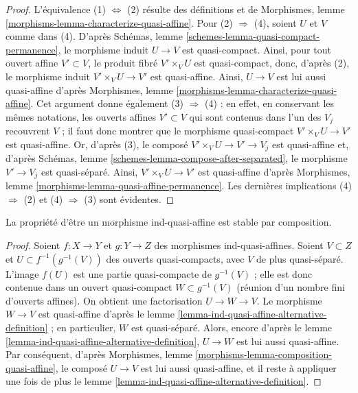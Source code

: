 \begin{proof}
L'équivalence (1) $\Leftrightarrow$ (2)
résulte des définitions et de
Morphismes, lemme \ref{morphisms-lemma-characterize-quasi-affine}.
Pour (2) $\Rightarrow$ (4), soient $U$ et $V$ comme dans (4). D'après
Schémas, lemme \ref{schemes-lemma-quasi-compact-permanence}, le
morphisme induit $U \to V$ est quasi-compact. Ainsi, pour tout ouvert
affine $V' \subset V$, le produit fibré $V' \times_V U$ est quasi-compact,
donc, d'après (2), le morphisme induit $V' \times_V U \to V'$ est quasi-affine.
Ainsi, $U \to V$ est lui aussi quasi-affine d'après
Morphismes, lemme \ref{morphisms-lemma-characterize-quasi-affine}.
Cet argument donne également (3) $\Rightarrow$ (4) : en effet, en conservant les
mêmes notations, les ouverts affines $V' \subset V$ qui sont contenus dans l'un
des $V_j$ recouvrent $V$ ; il faut donc montrer que le morphisme
quasi-compact $V' \times_V U \to V'$ est quasi-affine.
Or, d'après (3), le composé $V' \times_V U \to V' \to V_j$
est quasi-affine et, d'après
Schémas, lemme \ref{schemes-lemma-compose-after-separated}, le morphisme
$V' \to V_j$ est quasi-séparé. Ainsi, $V' \times_V U \to V'$
est quasi-affine d'après
Morphismes, lemme \ref{morphisms-lemma-quasi-affine-permanence}.
Les dernières implications (4) $\Rightarrow$ (2) et (4) $\Rightarrow$ (3)
sont évidentes.
\end{proof}

\begin{lemma}
\label{lemma-ind-quasi-affine-composition}
La propriété d'être un morphisme ind-quasi-affine est stable par composition.
\end{lemma}

\begin{proof}
Soient $f : X \to Y$ et $g : Y \to Z$ des morphismes ind-quasi-affines.
Soient $V \subset Z$ et $U \subset f^{-1}(g^{-1}(V))$ des ouverts quasi-compacts,
avec $V$ de plus quasi-séparé. L'image $f(U)$ est une partie
quasi-compacte de $g^{-1}(V)$ ; elle est donc contenue dans un
ouvert quasi-compact $W \subset g^{-1}(V)$ (réunion d'un nombre fini d'ouverts affines).
On obtient une factorisation $U \to W \to V$. Le morphisme $W \to V$ est quasi-affine
d'après le lemme \ref{lemma-ind-quasi-affine-alternative-definition} ; en
particulier, $W$ est quasi-séparé. Alors, encore d'après le
lemme \ref{lemma-ind-quasi-affine-alternative-definition}, $U \to W$
est lui aussi quasi-affine. Par conséquent, d'après Morphismes,
lemme \ref{morphisms-lemma-composition-quasi-affine}, le composé
$U \to V$ est lui aussi quasi-affine, et il reste à appliquer
une fois de plus le lemme \ref{lemma-ind-quasi-affine-alternative-definition}.
\end{proof}

